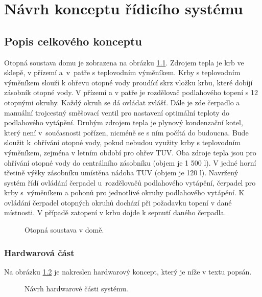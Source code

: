 \chapter{Návrh konceptu řídicího systému}

\section{Popis celkového konceptu}
\label{sec:popis-celkoveho-konceptu}

Otopná soustava domu je zobrazena na obrázku \ref{fig:otopna-soustava-rez-domu}. Zdrojem tepla je krb ve sklepě, v přízemí a~v~patře s teplovodním výměníkem. Krby s teplovodním výměníkem slouží k ohřevu otopné vody proudící skrz vložku krbu, které dobíjí zásobník otopné vody. V přízemí a v patře je rozdělovač podlahového topení s 12 otopnými okruhy. Každý okruh se dá ovládat zvlášť. Dále je zde čerpadlo a manuální trojcestný směšovací ventil pro nastavení optimální teploty do podlahového vytápění. Druhým zdrojem tepla je plynový kondenzační kotel, který není v~současnosti pořízen, nicméně se s ním počítá do budoucna. Bude sloužit k~ohřívání otopné vody, pokud nebudou využity krby s teplovodním výměníkem, zejména v letním období pro ohřev TUV. Oba zdroje tepla jsou pro ohřívání otopné vody do centrálního zásobníku (objem je 1 500 l). V jedné horní třetině výšky zásobníku umístěna nádoba TUV (objem je 120 l). Navržený systém řídí ovládání čerpadel u~rozdělovačů podlahového vytápění, čerpadel pro krby s~výměníkem a pohonů pro jednotlivé okruhy podlahového vytápění. K ovládání čerpadel otopných okruhů dochází při požadavku topení v dané místnosti. V případě zatopení v krbu dojde k sepnutí daného čerpadla.


\begin{figure}[H]
    \centering
    \def\svgwidth{\columnwidth}
    
    \caption{Otopná soustava v domě.}
    \label{fig:otopna-soustava-rez-domu}
\end{figure}

\newpage

\subsection{Hardwarová část}

Na obrázku \ref{fig:navrh-hardwarove-casti} je nakreslen hardwarový koncept, který je níže v textu popsán.

\begin{figure}[H]
    \centering
    \def\svgwidth{\columnwidth}
    
    \caption{ Návrh hardwarové části systému.}
    \label{fig:navrh-hardwarove-casti}
\end{figure}


